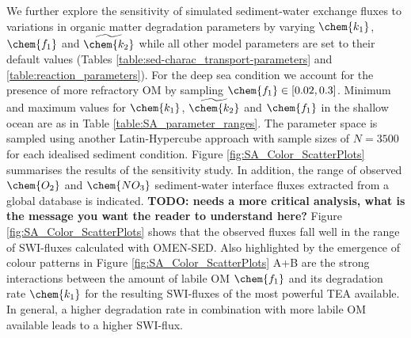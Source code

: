 \documentclass[gmd, manuscript]{copernicus}
\begin{document}
We further explore the sensitivity of simulated sediment-water exchange fluxes to variations in organic matter degradation parameters by varying $\chem{k_1}$, $\chem{f_1}$ and $\widetilde{\chem{k_2}}$ while all other model 
parameters are set to their default values (Tables \ref{table:sed-charac_transport-parameters} and \ref{table:reaction_parameters}). For the deep sea condition we account for the presence of more refractory OM by 
sampling $\chem{f_1} \in [0.02, 0.3]$. Minimum and maximum values for $\chem{k_1}$, $\widetilde{\chem{k_2}}$ and $\chem{f_1}$ in the shallow ocean are as in Table \ref{table:SA_parameter_ranges}. 
The parameter space is sampled using another Latin-Hypercube approach with sample sizes of $N=3500$ for each idealised sediment condition. 
Figure \ref{fig:SA_Color_ScatterPlots} summarises the results of the sensitivity study. In addition, the range of observed $\chem{O_2}$ and $\chem{NO_3}$ sediment-water interface 
fluxes extracted from a global database \citep{bohlen_simple_2012} is indicated. 
\textbf{TODO: needs a more critical analysis, what is the message you want the reader to understand here?}
Figure \ref{fig:SA_Color_ScatterPlots} shows that the observed fluxes fall well in the range of SWI-fluxes calculated with OMEN-SED. 
Also highlighted by the emergence of colour patterns in Figure \ref{fig:SA_Color_ScatterPlots} A+B are the strong interactions between the amount of labile OM  $\chem{f_1}$ and 
its degradation rate $\chem{k_1}$ for the resulting SWI-fluxes of the most powerful TEA available. In general, a higher degradation rate in combination with more labile OM available 
leads to a higher SWI-flux. 

\end{document}
